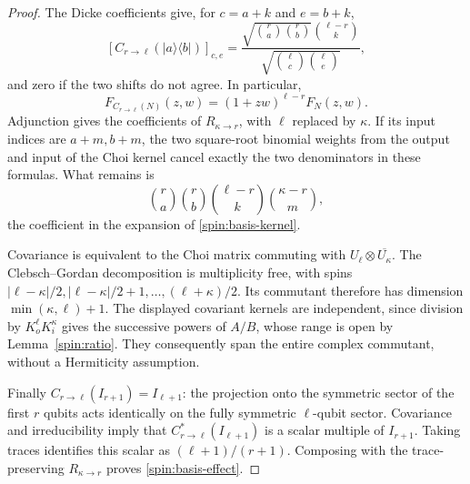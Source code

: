 \documentclass[reqno]{amsart}
\theoremstyle{definition}
\theoremstyle{remark}
\begin{document}
\begin{proof}
The Dicke coefficients give, for $c=a+k$ and $e=b+k$,
\begin{equation}\label{spin:compression-coefficients}
 [C_{r\to\ell}(|a\rangle\langle b|)]_{c,e}
 =\frac{\sqrt{\binom ra\binom rb}\binom{\ell-r}{k}}
             {\sqrt{\binom\ell c\binom\ell e}},
\end{equation}
and zero if the two shifts do not agree.  In particular,
\begin{equation}\label{spin:kernel-multiplication}
 F_{C_{r\to\ell}(N)}(z,w)=(1+zw)^{\ell-r}F_N(z,w).
\end{equation}
Adjunction gives the coefficients of $R_{\kappa\to r}$, with
$\ell$ replaced by $\kappa$.  If its input indices are $a+m,b+m$,
the two square-root binomial weights from the output and input of the
Choi kernel cancel exactly the two denominators in these formulas.
What remains is
\[
 \binom ra\binom rb\binom{\ell-r}{k}\binom{\kappa-r}{m},
\]
the coefficient in the expansion of \eqref{spin:basis-kernel}.

Covariance is equivalent to the Choi matrix commuting with
$U_\ell\otimes\overline{U_\kappa}$.  The Clebsch--Gordan decomposition
is multiplicity free, with spins
$|\ell-\kappa|/2,|\ell-\kappa|/2+1,\ldots,(\ell+\kappa)/2$.
Its commutant therefore has dimension $\min(\kappa,\ell)+1$.
The displayed covariant kernels are independent, since division by
$K_o^\ell K_i^\kappa$ gives the successive powers of $A/B$, whose
range is open by Lemma~\ref{spin:ratio}.  They consequently span the
entire complex commutant, without a Hermiticity assumption.

Finally $C_{r\to\ell}(I_{r+1})=I_{\ell+1}$: the projection onto the
symmetric sector of the first $r$ qubits acts identically on the fully
symmetric $\ell$-qubit sector.  Covariance and irreducibility imply that
$C_{r\to\ell}^*(I_{\ell+1})$ is a scalar multiple of $I_{r+1}$.
Taking traces identifies this scalar as $(\ell+1)/(r+1)$.
Composing with the trace-preserving $R_{\kappa\to r}$ proves
\eqref{spin:basis-effect}.
\end{proof}
\end{document}
